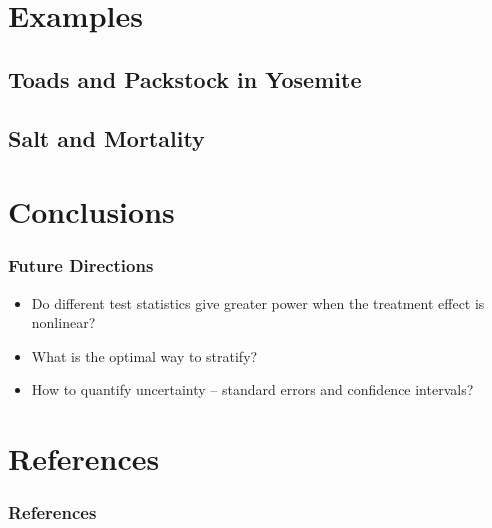 \documentclass{beamer}
\begin{document}
\section[Examples]{Examples}

\subsection[Toads and Packstock in Yosemite]{Toads and Packstock in Yosemite}


\subsection[Salt and Mortality]{Salt and Mortality}

\section[Conclusions]{Conclusions}
\frame
{
  \frametitle{Future Directions}
\begin{center}
\begin{itemize}
\item Do different test statistics give greater power when the treatment effect is nonlinear?
\item What is the optimal way to stratify?
\item How to quantify uncertainty -- standard errors and confidence intervals?
\end{itemize}
\end{center}
}




\section{References}
\begin{frame}
\frametitle{References}


\itemize
\end{frame}
\end{document}
